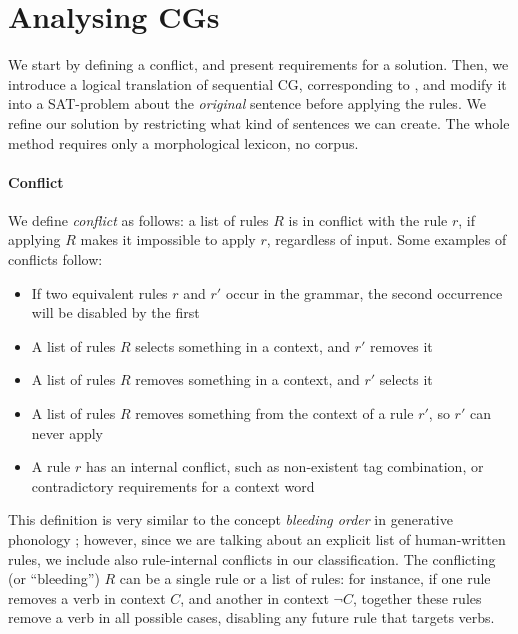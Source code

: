 \section{Analysing CGs}
\label{sec:sectionCGana}

We start by defining a conflict, and present requirements for a solution.
Then, we introduce a logical translation of sequential CG, corresponding to \cite{lager_nivre01}, and modify it into a SAT-problem about the \emph{original} sentence before applying the rules.
We refine our solution by restricting what kind of sentences we can create.
The whole method requires only a morphological lexicon, no corpus. 

\paragraph{Conflict}

We define \emph{conflict} as follows: a list of rules $R$ is in conflict with the rule $r$, if applying $R$ makes it impossible to apply $r$, regardless of input. 
Some examples of conflicts follow:

\begin{itemize}
\item If two equivalent rules $r$ and $r'$ occur in the grammar, the second occurrence will be disabled by the first
\item A list of rules $R$ selects something in a context, and $r'$ removes it
\item A list of rules $R$ removes something in a context, and $r'$ selects it
\item A list of rules $R$ removes something from the context of a rule $r'$, so $r'$ can never apply
\item A rule $r$ has an internal conflict, such as non-existent
tag combination, or contradictory requirements for a context word
\end{itemize}

This definition is very similar to the concept \emph{bleeding order} in generative phonology ; however, since we are talking about an explicit list of 
human-written rules, we include also rule-internal conflicts in our classification.
The conflicting (or ``bleeding'') $R$ can be a single rule or a list of rules: for instance, if one rule removes a verb in
context $C$, and another in context $\neg C$, together these rules
remove a verb in all possible cases, disabling any future rule that
targets verbs.

